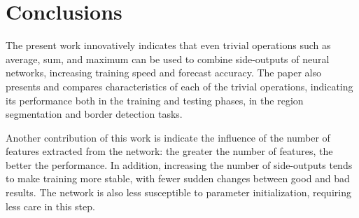 \section{Conclusions}
\label{cap7_contribuicoes}


The present work innovatively indicates that even trivial operations such as average, sum, and maximum can be used to combine side-outputs of neural networks, increasing training speed and forecast accuracy.
The paper also presents and compares characteristics of each of the trivial operations, indicating its performance both in the training and testing phases, in the region segmentation and border detection tasks.

Another contribution of this work is indicate the influence of the number of features extracted from the network: the greater the number of features, the better the performance.
In addition, increasing the number of side-outputs tends to make training more stable, with fewer sudden changes between good and bad results.
The network is also less susceptible to parameter initialization, requiring less care in this step.


